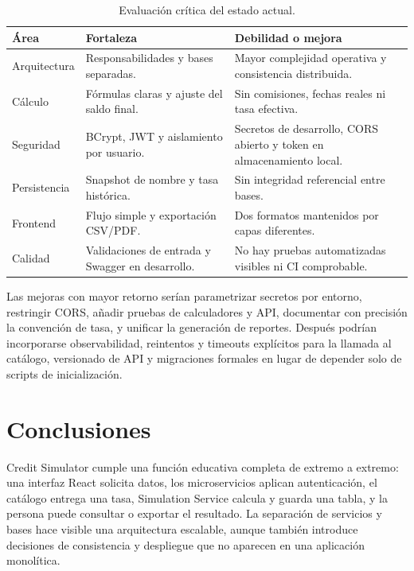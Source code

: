 \documentclass[12pt,a4paper]{article}
\begin{document}
\begin{table}[H]
\centering
\caption{Evaluación crítica del estado actual.}
\label{tab:evaluacion}
\begin{tabular}{>{\raggedright\arraybackslash}p{}
>{\raggedright\arraybackslash}p{}
>{\raggedright\arraybackslash}p{}}
\hline
\textbf{Área} & \textbf{Fortaleza} & \textbf{Debilidad o mejora}\\
\hline
Arquitectura & Responsabilidades y bases separadas. &
Mayor complejidad operativa y consistencia distribuida.\\
Cálculo & Fórmulas claras y ajuste del saldo final. &
Sin comisiones, fechas reales ni tasa efectiva.\\
Seguridad & BCrypt, JWT y aislamiento por usuario. &
Secretos de desarrollo, CORS abierto y token en almacenamiento local.\\
Persistencia & Snapshot de nombre y tasa histórica. &
Sin integridad referencial entre bases.\\
Frontend & Flujo simple y exportación CSV/PDF. &
Dos formatos mantenidos por capas diferentes.\\
Calidad & Validaciones de entrada y Swagger en desarrollo. &
No hay pruebas automatizadas visibles ni CI comprobable.\\
\hline
\end{tabular}
\end{table}

Las mejoras con mayor retorno serían parametrizar secretos por entorno,
restringir CORS, añadir pruebas de calculadores y API, documentar con precisión
la convención de tasa, y unificar la generación de reportes. Después podrían
incorporarse observabilidad, reintentos y timeouts explícitos para la llamada
al catálogo, versionado de API y migraciones formales en lugar de depender
solo de scripts de inicialización.

\section{Conclusiones}

Credit Simulator cumple una función educativa completa de extremo a extremo:
una interfaz React solicita datos, los microservicios aplican autenticación,
el catálogo entrega una tasa, Simulation Service calcula y guarda una tabla, y
la persona puede consultar o exportar el resultado. La separación de
servicios y bases hace visible una arquitectura escalable, aunque también
introduce decisiones de consistencia y despliegue que no aparecen en una
aplicación monolítica.
\end{document}
